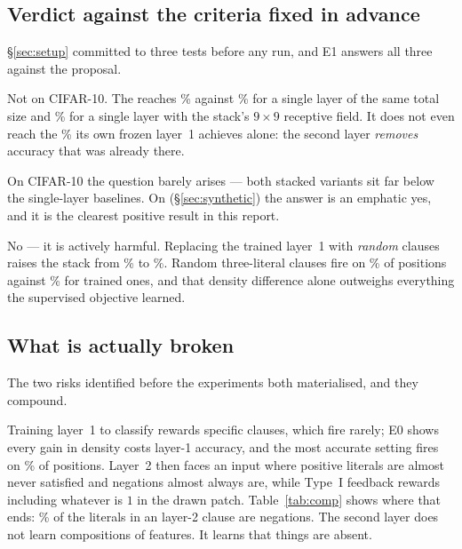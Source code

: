 \subsection{Verdict against the criteria fixed in advance}

\S\ref{sec:setup} committed to three tests before any run, and E1 answers all three against
the proposal.

\begin{ttkey}
 Not on CIFAR-10. The \mctm
reaches \accMctm{}\% against \accSingleMatched{}\% for a single layer of the same total size
and \accSingleRf{}\% for a single layer with the stack's $9\times9$ receptive field. It does
not even reach the \accSingleLOne{}\% its own frozen layer~1 achieves alone: the second layer
\emph{removes} accuracy that was already there.

 On CIFAR-10 the question barely arises --- both
stacked variants sit far below the single-layer baselines. On 
(\S\ref{sec:synthetic}) the answer is an emphatic yes, and it is the clearest positive result
in this report.

 No --- it is actively harmful.
Replacing the trained layer~1 with \emph{random} clauses raises the stack from \accMctm{}\%
to \accMctmRandom{}\%. Random three-literal clauses fire on \fireMctmRandom{}\% of positions
against \fireMctm{}\% for trained ones, and that density difference alone outweighs
everything the supervised objective learned.
\end{ttkey}

\subsection{What is actually broken}

The two risks identified before the experiments both materialised, and they compound.

 Training layer~1 to classify rewards specific
clauses, which fire rarely; E0 shows every gain in density costs layer-1 accuracy, and the
most accurate setting fires on \densitySparsestFire{}\% of positions. Layer~2 then faces an
input where positive literals are almost never satisfied and negations almost always are,
while Type~I feedback rewards including whatever is $1$ in the drawn patch.
Table~\ref{tab:comp} shows where that ends: \negMctm{}\% of the literals in an \mctm layer-2
clause are negations. The second layer does not learn compositions of features. It learns
that things are absent.

